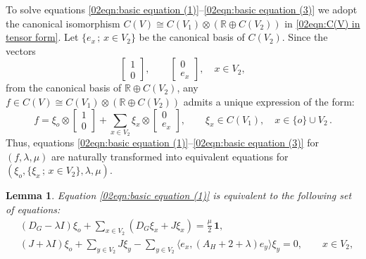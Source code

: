 \documentclass[12pt,a4paper]{article}
\newtheorem{lemma}[theorem]{Lemma}
\newcommand{\1}{{\bm 1}}
\numberwithin{equation}{section}
\begin{document}
To solve equations
\eqref{02eqn:basic equation (1)}--\eqref{02eqn:basic equation (3)}
we adopt the canonical isomorphism
$C(V)\cong C(V_1)\otimes(\mathbb{R}\oplus C(V_2))$ in
\eqref{02eqn:C(V) in tensor form}.
Let $\{e_x\,;\, x\in V_2\}$ be the canonical basis of $C(V_2)$.
Since the vectors 
%
\begin{equation}\label{02eqn:canonical base}
\begin{bmatrix} 1 \\ 0 \end{bmatrix},
\qquad
\begin{bmatrix} 0 \\ e_x \end{bmatrix},
\quad x\in V_2,
\end{equation}
%
from the canonical basis of $\mathbb{R}\oplus C(V_2)$,
any $f\in C(V) \cong C(V_1)\otimes (\mathbb{R}\oplus C(V_2))$
admits a unique expression of the form:
%
\begin{equation}\label{02eqn:expansion of f in C(V)}
f=\xi_o\otimes \begin{bmatrix} 1 \\ 0 \end{bmatrix}
+ \sum_{x\in V_2} \xi_x\otimes \begin{bmatrix} 0 \\ e_x \end{bmatrix},
\qquad
\xi_x \in C(V_1),
\quad x\in \{o\}\cup V_2\,.
\end{equation}
%
Thus, equations 
\eqref{02eqn:basic equation (1)}--\eqref{02eqn:basic equation (3)}
for $(f,\lambda,\mu)$ 
are naturally transformed into equivalent equations
for $(\xi_o,\{\xi_x\,;\,x\in V_2\},\lambda,\mu)$.
 
\begin{lemma}\label{02lem:equivalent form of 2.10}
Equation \eqref{02eqn:basic equation (1)} is equivalent to
the following set of equations:
%
\begin{align}
&(D_G-\lambda I)\xi_o 
+\sum_{x\in V_2}(D_G\xi_x+J\xi_x)=\frac{\mu}{2}\,\bm{1},
\label{02eqn:basic equation (011)}
\\
&(J+\lambda I)\xi_o +\sum_{y\in V_2} J\xi_y
-\sum_{y\in V_2} \langle e_x, (A_H+2+\lambda)e_y\rangle \xi_y=0,
\qquad x\in V_2,
\label{02eqn:basic equation (012)}
\end{align}
\end{lemma}
\end{document}
